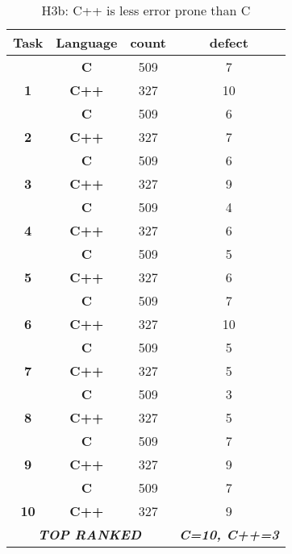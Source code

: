 \begin{table}
\centering
\scriptsize
\renewcommand{\baselinestretch}{.5} 
\caption{H3b: C++ is less error prone than C}
\label{tab:h3b}
\begin{tabular}{|c|c|c|c|}
\hline
\textbf{Task} & \textbf{Language} & \textbf{count} & \textbf{defect} \\ \hline
 & \textbf{C} & 509 & \cellcolor[HTML]{C0C0C0}7 \\ \cline{2-4} 
\multirow{-2}{*}{\textbf{1}} & \textbf{C++} & 327 & 10 \\ \hline
 & \textbf{C} & 509 & \cellcolor[HTML]{C0C0C0}6 \\ \cline{2-4} 
\multirow{-2}{*}{\textbf{2}} & \textbf{C++} & 327 & \cellcolor[HTML]{C0C0C0}7 \\ \hline
 & \textbf{C} & 509 & \cellcolor[HTML]{C0C0C0}6 \\ \cline{2-4} 
\multirow{-2}{*}{\textbf{3}} & \textbf{C++} & 327 & 9 \\ \hline
 & \textbf{C} & 509 & \cellcolor[HTML]{C0C0C0}4 \\ \cline{2-4} 
\multirow{-2}{*}{\textbf{4}} & \textbf{C++} & 327 & 6 \\ \hline
 & \textbf{C} & 509 & \cellcolor[HTML]{C0C0C0}5 \\ \cline{2-4} 
\multirow{-2}{*}{\textbf{5}} & \textbf{C++} & 327 & 6 \\ \hline
 & \textbf{C} & 509 & \cellcolor[HTML]{C0C0C0}7 \\ \cline{2-4} 
\multirow{-2}{*}{\textbf{6}} & \textbf{C++} & 327 & \cellcolor[HTML]{C0C0C0}10 \\ \hline
 & \textbf{C} & 509 & \cellcolor[HTML]{C0C0C0}5 \\ \cline{2-4} 
\multirow{-2}{*}{\textbf{7}} & \textbf{C++} & 327 & \cellcolor[HTML]{C0C0C0}5 \\ \hline
 & \textbf{C} & 509 & \cellcolor[HTML]{C0C0C0}3 \\ \cline{2-4} 
\multirow{-2}{*}{\textbf{8}} & \textbf{C++} & 327 & 5 \\ \hline
 & \textbf{C} & 509 & \cellcolor[HTML]{C0C0C0}7 \\ \cline{2-4} 
\multirow{-2}{*}{\textbf{9}} & \textbf{C++} & 327 & 9 \\ \hline
 & \textbf{C} & 509 & \cellcolor[HTML]{C0C0C0}7 \\ \cline{2-4} 
\multirow{-2}{*}{\textbf{10}} & \textbf{C++} & 327 & 9 \\ \hline
\multicolumn{3}{|c|}{\textit{\textbf{TOP RANKED}}} & \textit{\textbf{C=10, C++=3}} \\ \hline
\end{tabular}
\end{table}
